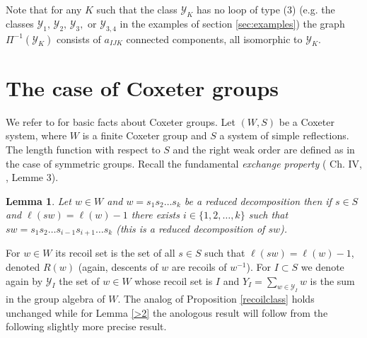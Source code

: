 \documentclass[11pt,a4paper]{amsart}
\newtheorem{lemma}[theorem]{Lemma}
\theoremstyle{contraction}
\begin{document}
Note that for any $K$ such that the class ${\mathcal Y}_K$ has no loop of type (3) (e.g. the classes
${\mathcal Y}_1,\,{\mathcal Y}_2,\,{\mathcal Y}_3,$ or ${\mathcal Y}_{3,4}$ in the examples of section \ref{sec:examples}) the graph $\Pi^{-1}({\mathcal Y}_K)$ consists of $a_{IJK}$ connected components, all isomorphic to ${\mathcal Y}_K$.
\section{The case of Coxeter groups}
We refer to  \cite{Bou} for basic facts about Coxeter groups.
Let $(W,S)$ be a Coxeter system, where $W$ is a finite Coxeter group and $S$ a system of simple reflections. The length function with respect to $S$ and the right weak order are defined as in the case of symmetric groups. Recall the fundamental {\sl exchange property} (\cite{Bou}  Ch. IV, , Lemme 3).
\begin{lemma}\label{exchange}
Let $w\in W$ and $w=s_1s_2\ldots s_k$ be a reduced decomposition then if $s\in S$ and $\ell (sw)=\ell(w)-1$ there exists $i\in\{1,2,\ldots,k\}$ such that $sw=s_1s_2\ldots s_{i-1}s_{i+1}\ldots s_k$ (this is a reduced decomposition of $sw$).
\end{lemma}



 For $w\in W$ its recoil set is the set of all $s\in S$ such that $\ell(sw)=\ell(w)-1$,   denoted $R(w)$ (again, descents of $w$ are recoils of $w^{-1}$). For $I\subset S$ we denote again by ${\mathcal Y}_I$ the set of $w\in W$ whose recoil set is $I$ and $Y_I=\sum_{w\in {\mathcal Y}_I}w$ is the sum in the group algebra of $W$.
The analog of Proposition \ref{recoilclass} holds unchanged while for Lemma \ref{>2} the anologous result will follow from the following slightly more precise result. 
\end{document}
